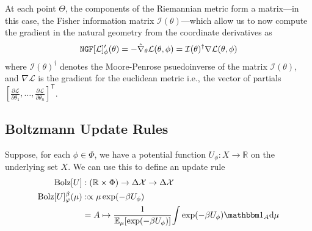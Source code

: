 \documentclass{article}
\begin{document}
At each point $\Theta$, the components of the Riemannian metric form a matrix---in this case, the Fisher information matrix $\mathcal I(\theta)$---which allow us to now compute the gradient in the natural geometry from the coordinate derivatives as
\[
    \mathtt{NGF}[\cal L]'_\phi (\theta) = - \hat \nabla_\theta \mathcal L(\theta,\phi)
        = \mathcal I(\theta)^{\dagger}  \nabla \mathcal L(\theta, \phi)
\]
where $ \mathcal I(\theta)^{\dagger} $ denotes the Moore-Penrose psuedoinverse of the matrix $ \mathcal I(\theta)$,
and $\nabla \mathcal L$ is the gradient for the euclidean metric i.e., the vector of partials $[\frac{\partial \mathcal L}{\partial \theta_1}, %
 \ldots, \frac{\partial \mathcal L}{\partial \theta_n}]^{\mathsf T}$.

\TODO


\subsection{Boltzmann Update Rules}
%
%
\def\Bolz#1{\mathrm{Bolz}[#1]}
Suppose, for each $\phi \in \Phi$, we have a potential function $U_\phi : X \to \mathbb R$ on the underlying set $X$.
We can use this to define an update rule
\begin{align*}
    \Bolz U &: (\mathbb R \times \Phi) \to \Delta\X \to \Delta\X \\
    \Bolz U^\beta_\varphi(\mu)
        &:\propto
            \mu \exp(-\beta U_\phi) \\
        &= A \mapsto \frac
            1{\Ex_{\mu} [ \exp(-\beta U_\phi)]}
            {\int \exp(-\beta U_\phi) \mathbbm 1_A \mathrm d\mu }
\end{align*}
\end{document}
